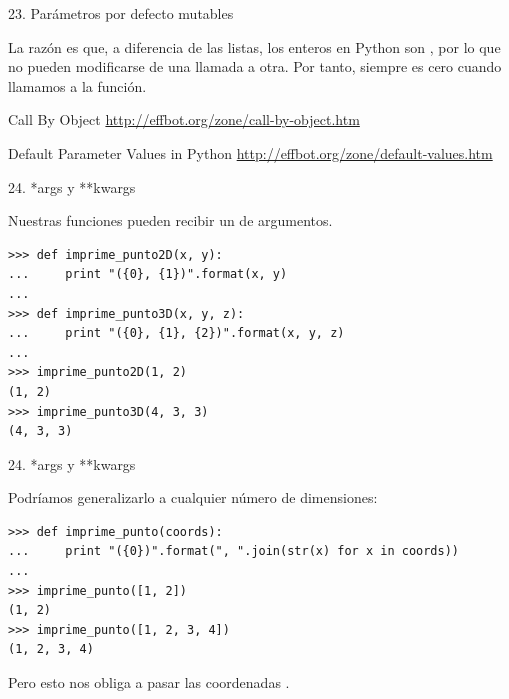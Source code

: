 \documentclass[14pt]{beamer}
\begin{document}
\begin{frame}[fragile]{23. Parámetros por defecto mutables}
  \begin{block}{}
    \centering
    La razón es que, a diferencia de las listas, los enteros en Python
    son , por lo que no pueden modificarse de
    una llamada a otra. Por tanto,  siempre es cero
    cuando llamamos a la función.
  \end{block}

  \small
  \begin{block}
    {\centering Call By Object}
    \centering \url{http://effbot.org/zone/call-by-object.htm}
  \end{block}

  \begin{block}
    {\centering Default Parameter Values in Python}
    \centering \url{http://effbot.org/zone/default-values.htm}
  \end{block}
\end{frame}

\begin{frame}[fragile]{24. *args y **kwargs}
  \begin{block}{}
    \small
    \centering
    Nuestras funciones pueden recibir un 
    de argumentos.
  \end{block}

  \begin{exampleblock}{}
    \footnotesize
    \begin{lstlisting}
>>> def imprime_punto2D(x, y):
...     print "({0}, {1})".format(x, y)
...
>>> def imprime_punto3D(x, y, z):
...     print "({0}, {1}, {2})".format(x, y, z)
...
>>> imprime_punto2D(1, 2)
(1, 2)
>>> imprime_punto3D(4, 3, 3)
(4, 3, 3)
    \end{lstlisting}
  \end{exampleblock}
\end{frame}

\begin{frame}[fragile]{24. *args y **kwargs}
  \begin{block}{}
    \small
    \centering
    Podríamos generalizarlo a cualquier número de dimensiones:
  \end{block}

  \begin{exampleblock}{}
    \scriptsize
    \begin{lstlisting}
>>> def imprime_punto(coords):
...     print "({0})".format(", ".join(str(x) for x in coords))
...
>>> imprime_punto([1, 2])
(1, 2)
>>> imprime_punto([1, 2, 3, 4])
(1, 2, 3, 4)
    \end{lstlisting}
  \end{exampleblock}

  \begin{alertblock}{}
    \small
    \centering
    Pero esto nos obliga a pasar las coordenadas .
  \end{alertblock}
\end{frame}
\end{document}
